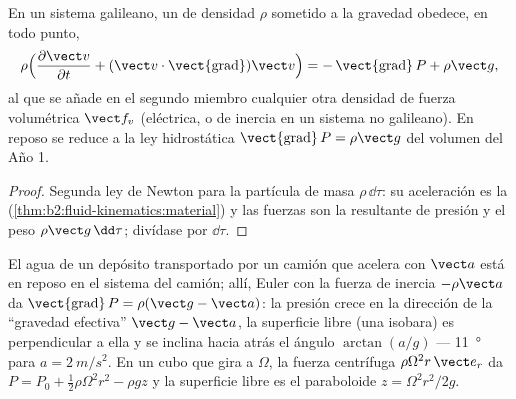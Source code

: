 \begin{theorem}\label{thm:b2:euler-bernoulli:euler}
En un sistema galileano, un  de densidad $\rho$ sometido a
la gravedad obedece, en todo punto,
\[
\rho\Bigl(\frac{\partial\vect v}{\partial t} + (\vect v\cdot\operatorname{\vect{grad}})
\vect v\Bigr) = -\operatorname{\vect{grad}}P + \rho\vect g ,
\]
al que se añade en el segundo miembro cualquier otra densidad de fuerza
volumétrica $\vect f_v$ (eléctrica, o de inercia en un sistema no
galileano). En reposo se reduce a la ley hidrostática
$\operatorname{\vect{grad}}P = \rho\vect g$ del volumen del Año 1.
\end{theorem}

\begin{proof}
Segunda ley de Newton para la partícula de masa $\rho\,\dd\tau$: su
aceleración es la 
(\cref{thm:b2:fluid-kinematics:material}) y las fuerzas son la resultante
de presión y el peso $\rho\vect g\,\dd\tau$; divídase por $\dd\tau$.
\end{proof}

\begin{example}\label{ex:b2:euler-bernoulli:tank}
El agua de un depósito transportado por un camión que acelera con $\vect a$
está en reposo en el sistema del camión; allí, Euler con la fuerza de
inercia $-\rho\vect a$ da $\operatorname{\vect{grad}}P = \rho(\vect g - \vect a)$:
la presión crece en la dirección de la ``gravedad efectiva''
$\vect g - \vect a$, la superficie libre (una isobara) es perpendicular a
ella y se inclina hacia atrás el ángulo $\arctan(a/g)$ ---
\qty{11}{\degree} para $a = \qty{2}{m/s^2}$. En un cubo que gira a
$\Omega$, la fuerza centrífuga $\rho\Omega^2r\,\vect e_r$ da
$P = P_0 + \tfrac12\rho\Omega^2r^2 - \rho gz$ y la superficie libre es el
paraboloide $z = \Omega^2r^2/2g$.
\end{example}

